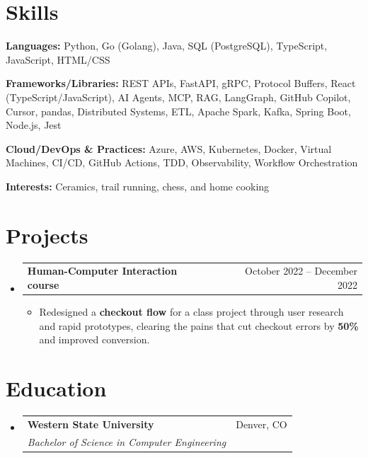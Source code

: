 \documentclass[letterpaper,10.9pt]{article}
\makeatletter
\newcommand{\resumeItem}[1]{
  \item\small{
    {#1 \vspace{-2pt}}
  }
}
\newcommand{\resumeSubheading}[4]{
  \vspace{-2pt}\item
    \begin{tabular*}{0.97\textwidth}[t]{l@{\extracolsep{\fill}}r}
      \textbf{#1} & #2 \\
      \textit{\small#3} & \textit{\small #4} \\
    \end{tabular*}\vspace{-7pt}
}
\newcommand{\resumeProjectHeading}[2]{
    \item
    \begin{tabular*}{0.97\textwidth}{l@{\extracolsep{\fill}}r}
      \small#1 & #2 \\
    \end{tabular*}\vspace{-7pt}
}
\newcommand{\resumeSubHeadingListStart}{\begin{itemize}[leftmargin=0.15in, label={}]}
\newcommand{\resumeSubHeadingListEnd}{\end{itemize}}
\newcommand{\resumeItemListStart}{\begin{itemize}}
\newcommand{\resumeItemListEnd}{\end{itemize}\vspace{-5pt}}
\makeatother
\begin{document}
\section{Skills}
 \begin{itemize}[leftmargin=0.15in, label={}, itemsep=-2pt ]
    \small{
    \item \textbf{Languages:} Python, Go (Golang), Java, SQL (PostgreSQL), TypeScript, JavaScript, HTML/CSS
    \item \textbf{Frameworks/Libraries:} REST APIs, FastAPI, gRPC, Protocol Buffers, React (TypeScript/JavaScript), AI Agents, MCP, RAG, LangGraph, GitHub Copilot, Cursor, pandas, Distributed Systems, ETL, Apache Spark, Kafka, Spring Boot, Node.js, Jest
    \item \textbf{Cloud/DevOps \& Practices:} Azure, AWS, Kubernetes, Docker, Virtual Machines, CI/CD, GitHub Actions, TDD, Observability, Workflow Orchestration
    \item \textbf{Interests:} Ceramics, trail running, chess, and home cooking
    }
\end{itemize}

\section{Projects}
    \resumeSubHeadingListStart
      \resumeProjectHeading
          {\textbf{Human-Computer Interaction course}}{October 2022 -- December 2022}
          \resumeItemListStart
            \resumeItem{Redesigned a \textbf{checkout flow} for a class project through user research and rapid prototypes, clearing the pains that cut checkout errors by \textbf{50\%} and improved conversion.}
          \resumeItemListEnd
  \resumeSubHeadingListEnd

\section{Education}
  \resumeSubHeadingListStart
    \resumeSubheading
      {Western State University}{Denver, CO}
      {Bachelor of Science in Computer Engineering}{}
  \resumeSubHeadingListEnd
\end{document}
